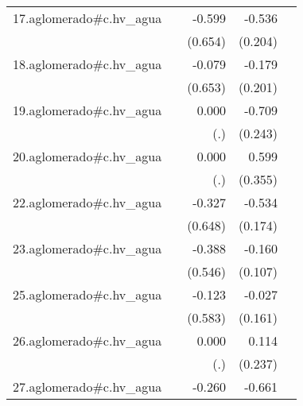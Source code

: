{\begin{longtable}{l*{4}{D{.}{.}{-1}}}
\addlinespace
17.aglomerado#c.hv\_agua&                     &      -0.599         &      -0.536\sym{**} &                     \\
            &                     &     (0.654)         &     (0.204)         &                     \\
\addlinespace
18.aglomerado#c.hv\_agua&                     &      -0.079         &      -0.179         &                     \\
            &                     &     (0.653)         &     (0.201)         &                     \\
\addlinespace
19.aglomerado#c.hv\_agua&                     &       0.000         &      -0.709\sym{**} &                     \\
            &                     &         (.)         &     (0.243)         &                     \\
\addlinespace
20.aglomerado#c.hv\_agua&                     &       0.000         &       0.599         &                     \\
            &                     &         (.)         &     (0.355)         &                     \\
\addlinespace
22.aglomerado#c.hv\_agua&                     &      -0.327         &      -0.534\sym{**} &                     \\
            &                     &     (0.648)         &     (0.174)         &                     \\
\addlinespace
23.aglomerado#c.hv\_agua&                     &      -0.388         &      -0.160         &                     \\
            &                     &     (0.546)         &     (0.107)         &                     \\
\addlinespace
25.aglomerado#c.hv\_agua&                     &      -0.123         &      -0.027         &                     \\
            &                     &     (0.583)         &     (0.161)         &                     \\
\addlinespace
26.aglomerado#c.hv\_agua&                     &       0.000         &       0.114         &                     \\
            &                     &         (.)         &     (0.237)         &                     \\
\addlinespace
27.aglomerado#c.hv\_agua&                     &      -0.260         &      -0.661\sym{***}&                     \\

\end{longtable}}

